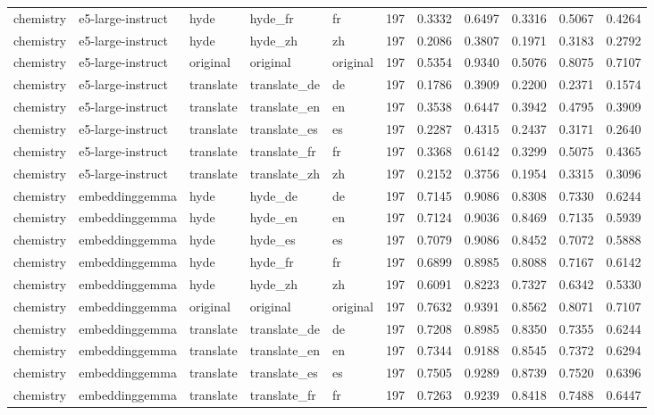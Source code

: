 \begin{tabular}{lllllrrrrrr}
chemistry & e5-large-instruct & hyde & hyde\_fr & fr & 197 & 0.3332 & 0.6497 & 0.3316 & 0.5067 & 0.4264 \\
chemistry & e5-large-instruct & hyde & hyde\_zh & zh & 197 & 0.2086 & 0.3807 & 0.1971 & 0.3183 & 0.2792 \\
chemistry & e5-large-instruct & original & original & original & 197 & 0.5354 & 0.9340 & 0.5076 & 0.8075 & 0.7107 \\
chemistry & e5-large-instruct & translate & translate\_de & de & 197 & 0.1786 & 0.3909 & 0.2200 & 0.2371 & 0.1574 \\
chemistry & e5-large-instruct & translate & translate\_en & en & 197 & 0.3538 & 0.6447 & 0.3942 & 0.4795 & 0.3909 \\
chemistry & e5-large-instruct & translate & translate\_es & es & 197 & 0.2287 & 0.4315 & 0.2437 & 0.3171 & 0.2640 \\
chemistry & e5-large-instruct & translate & translate\_fr & fr & 197 & 0.3368 & 0.6142 & 0.3299 & 0.5075 & 0.4365 \\
chemistry & e5-large-instruct & translate & translate\_zh & zh & 197 & 0.2152 & 0.3756 & 0.1954 & 0.3315 & 0.3096 \\
chemistry & embeddinggemma & hyde & hyde\_de & de & 197 & 0.7145 & 0.9086 & 0.8308 & 0.7330 & 0.6244 \\
chemistry & embeddinggemma & hyde & hyde\_en & en & 197 & 0.7124 & 0.9036 & 0.8469 & 0.7135 & 0.5939 \\
chemistry & embeddinggemma & hyde & hyde\_es & es & 197 & 0.7079 & 0.9086 & 0.8452 & 0.7072 & 0.5888 \\
chemistry & embeddinggemma & hyde & hyde\_fr & fr & 197 & 0.6899 & 0.8985 & 0.8088 & 0.7167 & 0.6142 \\
chemistry & embeddinggemma & hyde & hyde\_zh & zh & 197 & 0.6091 & 0.8223 & 0.7327 & 0.6342 & 0.5330 \\
chemistry & embeddinggemma & original & original & original & 197 & 0.7632 & 0.9391 & 0.8562 & 0.8071 & 0.7107 \\
chemistry & embeddinggemma & translate & translate\_de & de & 197 & 0.7208 & 0.8985 & 0.8350 & 0.7355 & 0.6244 \\
chemistry & embeddinggemma & translate & translate\_en & en & 197 & 0.7344 & 0.9188 & 0.8545 & 0.7372 & 0.6294 \\
chemistry & embeddinggemma & translate & translate\_es & es & 197 & 0.7505 & 0.9289 & 0.8739 & 0.7520 & 0.6396 \\
chemistry & embeddinggemma & translate & translate\_fr & fr & 197 & 0.7263 & 0.9239 & 0.8418 & 0.7488 & 0.6447 \\

\end{tabular}
